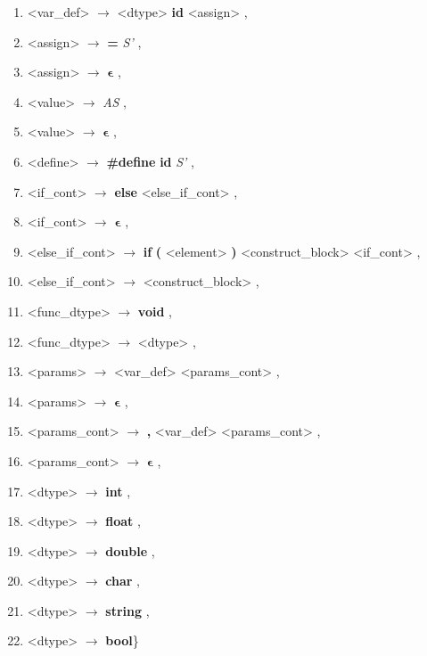 \begin{enumerate}[label={\arabic*:}]
    \item <var\_def> $\longrightarrow$ <dtype> \textbf{id} <assign> ,
    \item <assign> $\longrightarrow$ \textbf{=} \emph{S'} ,
    \item <assign> $\longrightarrow$ $\mathbf{ \epsilon }$ ,
    \item <value> $\longrightarrow$ \emph{AS} ,
    \item <value> $\longrightarrow$ $\mathbf{ \epsilon }$ ,

    \item <define> $\longrightarrow$ \textbf{\#define} \textbf{id} \emph{S'} ,

    \item <if\_cont> $\longrightarrow$ \textbf{else} <else\_if\_cont> ,
    \item <if\_cont> $\longrightarrow$ $\mathbf{ \epsilon }$ ,
    \item <else\_if\_cont> $\longrightarrow$ \textbf{if} \textbf{(} <element> \textbf{)} <construct\_block> <if\_cont> ,
    \item <else\_if\_cont> $\longrightarrow$ <construct\_block> ,

    \item <func\_dtype> $\longrightarrow$ \textbf{void} ,
    \item <func\_dtype> $\longrightarrow$ <dtype> ,

    \item <params> $\longrightarrow$ <var\_def> <params\_cont> ,
    \item <params> $\longrightarrow$ $\mathbf{ \epsilon }$ ,
    \item <params\_cont> $\longrightarrow$ \textbf{,} <var\_def> <params\_cont> ,
    \item <params\_cont> $\longrightarrow$ $\mathbf{ \epsilon }$ ,

    \item <dtype> $\longrightarrow$ \textbf{int} ,
    \item <dtype> $\longrightarrow$ \textbf{float} ,
    \item <dtype> $\longrightarrow$ \textbf{double} ,
    \item <dtype> $\longrightarrow$ \textbf{char} ,
    \item <dtype> $\longrightarrow$ \textbf{string} ,
    \item <dtype> $\longrightarrow$ \textbf{bool}\quad\}
\end{enumerate}



